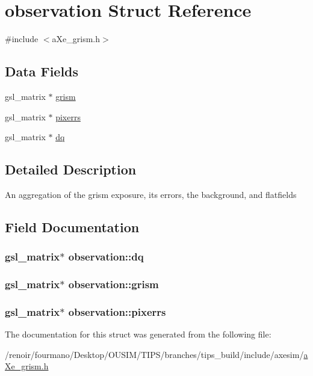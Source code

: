 \hypertarget{structobservation}{
\section{observation Struct Reference}
\label{structobservation}
}


{\ttfamily \#include $<$aXe\_\-grism.h$>$}\subsection*{Data Fields}
\begin{DoxyCompactItemize}
\item 
gsl\_\-matrix $\ast$ \hyperlink{structobservation_a012c0ff489fbb74fc6c9abfbd7c6e320}{grism}
\item 
gsl\_\-matrix $\ast$ \hyperlink{structobservation_a79ef486b081fa7b1973c39323f163010}{pixerrs}
\item 
gsl\_\-matrix $\ast$ \hyperlink{structobservation_a6698fa09a4524a5928ad9f98d620ba4e}{dq}
\end{DoxyCompactItemize}


\subsection{Detailed Description}
An aggregation of the grism exposure, its errors, the background, and flatfields 

\subsection{Field Documentation}
\hypertarget{structobservation_a6698fa09a4524a5928ad9f98d620ba4e}{
\subsubsection[{dq}]{\setlength{\rightskip}{0pt plus 5cm}gsl\_\-matrix$\ast$ {\bf observation::dq}}}
\label{structobservation_a6698fa09a4524a5928ad9f98d620ba4e}
\hypertarget{structobservation_a012c0ff489fbb74fc6c9abfbd7c6e320}{
\subsubsection[{grism}]{\setlength{\rightskip}{0pt plus 5cm}gsl\_\-matrix$\ast$ {\bf observation::grism}}}
\label{structobservation_a012c0ff489fbb74fc6c9abfbd7c6e320}
\hypertarget{structobservation_a79ef486b081fa7b1973c39323f163010}{
\subsubsection[{pixerrs}]{\setlength{\rightskip}{0pt plus 5cm}gsl\_\-matrix$\ast$ {\bf observation::pixerrs}}}
\label{structobservation_a79ef486b081fa7b1973c39323f163010}


The documentation for this struct was generated from the following file:\begin{DoxyCompactItemize}
\item 
/renoir/fourmano/Desktop/OUSIM/TIPS/branches/tips\_\-build/include/axesim/\hyperlink{aXe__grism_8h}{aXe\_\-grism.h}\end{DoxyCompactItemize}

